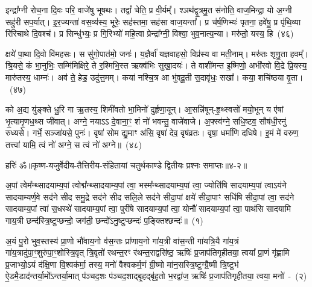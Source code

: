 इन्द्रा᳚ग्नी रोच॒ना दि॒वः परि॒ वाजे॑षु भूषथः। तद्वां᳚ चेति॒ प्र वी॒र्यम्᳚। श्ञथ॑द्वृ॒त्रमु॒त स॑नोति॒ वाज॒मिन्द्रा॒ यो अ॒ग्नी सहु॑री सप॒र्यात्। इ॒र॒ज्यन्ता॑ वस॒व्य॑स्य॒ भूरेः॒ सह॑स्तमा॒ सह॑सा वाज॒यन्ता᳚। प्र च॑र्\mbox{}ष॒णिभ्यः॑ पृतना॒ हवे॑षु॒ प्र पृ॑थि॒व्या रि॑रिचाथे दि॒वश्च॑। प्र सिन्धु॑भ्यः॒ प्र गि॒रिभ्यो॑ महि॒त्वा प्रेन्द्रा᳚ग्नी॒ विश्वा॒ भुव॒नात्य॒न्या। मरु॑तो॒ यस्य॒ हि~(४६)\ip

क्षये॑ पा॒था दि॒वो वि॑महसः। स सु॑गो॒पात॑मो॒ जनः॑। य॒ज्ञैर्वा॑ यज्ञवाहसो॒ विप्र॑स्य वा मती॒नाम्। मरु॑तः शृणु॒ता हवम्᳚। श्रि॒यसे॒ कं भा॒नुभिः॒ सम्मि॑मिक्षिरे॒ ते र॒श्मिभि॒स्त ऋक्व॑भिः सुखा॒दयः॑। ते वाशी॑मन्त इ॒ष्मिणो॒ अभी॑रवो वि॒द्रे प्रि॒यस्य॒ मारु॑तस्य॒ धाम्नः॑। अव॑ ते॒ हेड॒ उदु॑त्त॒मम्। कया॑ नश्चि॒त्र आ भु॑वदू॒ती स॒दावृ॑धः॒ सखा᳚। कया॒ शचि॑ष्ठया वृ॒ता।~(४७)\ip

को अ॒द्य यु॑ङ्क्ते धु॒रि गा ऋ॒तस्य॒ शिमी॑वतो भा॒मिनो॑ दुर्\mbox{}हृणा॒यून्। आ॒सन्नि॑षून्-हृ॒थ्स्वसो॑ मयो॒भून् य ए॑षां भृ॒त्यामृ॒णध॒थ्स जी॑वात्। अग्ने॒ नयाऽऽ दे॒वाना॒ꣳ॒ शं नो॑ भवन्तु॒ वाजे॑वाजे। अ॒फ्स्व॑ग्ने॒ सधि॒ष्टव॒ सौष॑धी॒रनु॑ रुध्यसे। गर्भे॒ सञ्जा॑यसे॒ पुनः॑। वृषा॑ सोम द्यु॒माꣳ अ॑सि॒ वृषा॑ देव॒ वृष॑व्रतः। वृषा॒ धर्मा॑णि दधिषे। इ॒मं मे॑ वरुण॒ तत्त्वा॑ यामि॒ त्वं नो॑ अग्ने॒ स त्वं नो॑ अग्ने॥~(४८)\ip

{\anuvakamend[{हि वृ॒ता म॒ एका॑\-दश च}]}%

{हरिः॑ ॐ}{॥कृष्ण-यजुर्वेदीय-तैत्तिरीय-संहितायां चतुर्थकाण्डे द्वितीयः प्रश्नः समाप्तः॥४-२॥}



\setcounter{anuvakam}{0}
अ॒पां त्वेम᳚न्थ्सादयाम्य॒पां त्वोद्म᳚न्थ्सादयाम्य॒पां त्वा॒ भस्म᳚न्थ्सादयाम्य॒पां त्वा॒ ज्योति॑षि सादयाम्य॒पां त्वाऽय॑ने सादयाम्यर्ण॒वे सद॑ने सीद समु॒द्रे सद॑ने सीद सलि॒ले सद॑ने सीदा॒पां क्षये॑ सीदा॒पाꣳ सधि॑षि सीदा॒पां त्वा॒ सद॑ने सादयाम्य॒पां त्वा॑ स॒धस्थे॑ सादयाम्य॒पां त्वा॒ पुरी॑षे सादयाम्य॒पां त्वा॒ योनौ॑ सादयाम्य॒पां त्वा॒ पाथ॑सि सादयामि गाय॒त्री छन्द॑स्त्रि॒ष्टुप्छन्दो॒ जग॑ती॒ छन्दो॑\-ऽनु॒ष्टुप्छन्दः॑ प॒ङ्क्तिश्छन्दः॑॥~(१)\ip

{\anuvakamend[{योनौ॒ पञ्च॑दश च}]}

अ॒यं पु॒रो भुव॒स्तस्य॑ प्रा॒णो भौ॑वाय॒नो व॑स॒न्तः प्रा॑णाय॒नो गा॑य॒त्री वा॑स॒न्ती गा॑यत्रि॒यै गा॑य॒त्रं गा॑य॒त्रादु॑पा॒ꣳ॒शु\-रु॑पा॒ꣳ॒शोस्त्रि॒वृत् त्रि॒वृतो॑ रथन्त॒रꣳ र॑थन्त॒राद्वसि॑ष्ठ॒ ऋषिः॑ प्र॒जा\-प॑तिगृहीतया॒ त्वया᳚ प्रा॒णं गृ॑ह्णामि प्र॒जाभ्यो॒\-ऽयं द॑क्षि॒णा वि॒श्वक॑र्मा॒ तस्य॒ मनो॑ वैश्वकर्म॒णं ग्री॒ष्मो मा॑न॒सस्त्रि॒ष्टुग्ग्रै॒ष्मी त्रि॒ष्टुभ॑ ऐ॒डमै॒डाद॑न्तर्या॒मो᳚\-ऽन्तर्या॒मात् प॑ञ्चद॒शः प॑ञ्चद॒शाद्बृ॒हद्बृ॑ह॒तो भ॒रद्वा॑ज॒ ऋषिः॑ प्र॒जा\-प॑तिगृहीतया॒ त्वया॒ मनो॑~-~(२)\ip

